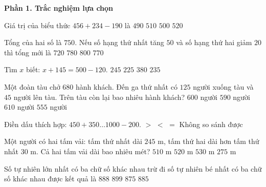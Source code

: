 \textbf{Phần 1. Trắc nghiệm lựa chọn}

\begin{ex} %
Giá trị của biểu thức $456 + 234 - 190$ là
\choice
{$490$}
{$510$}
{\True $500$}
{$520$}
\end{ex}

\begin{ex} %
Tổng của hai số là $750$. Nếu số hạng thứ nhất tăng $50$ và số hạng thứ hai giảm $20$ thì tổng mới là
\choice
{$720$}
{\True $780$}
{$800$}
{$770$}
\end{ex}

\begin{ex} %
Tìm $x$ biết: $x + 145 = 500 - 120$.
\choice
{$245$}
{$225$}
{$380$}
{\True $235$}
\end{ex}

\begin{ex} %
Một đoàn tàu chở $680$ hành khách. Đến ga thứ nhất có $125$ người xuống tàu và $45$ người lên tàu. Trên tàu còn lại bao nhiêu hành khách?
\choice
{\True $600$ người}
{$590$ người}
{$610$ người}
{$555$ người}
\end{ex}

\begin{ex} %
Điền dấu thích hợp: $450 + 350 \dots 1 000 - 200$.
\choice
{$>$}
{$<$}
{\True $=$}
{Không so sánh được}
\end{ex}

\begin{ex} %
Một người có hai tấm vải: tấm thứ nhất dài $245\text{ m}$, tấm thứ hai dài hơn tấm thứ nhất $30\text{ m}$. Cả hai tấm vải dài bao nhiêu mét?
\choice
{$510\text{ m}$}
{\True $520\text{ m}$}
{$530\text{ m}$}
{$275\text{ m}$}
\end{ex}

\begin{ex} %
Số tự nhiên lớn nhất có ba chữ số khác nhau trừ đi số tự nhiên bé nhất có ba chữ số khác nhau được kết quả là
\choice
{$888$}
{$899$}
{$875$}
{\True $885$}
\end{ex}

